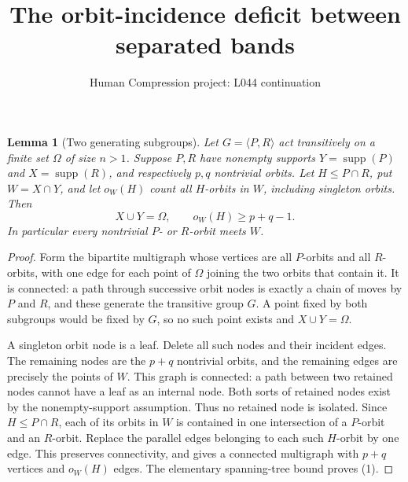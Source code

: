 \documentclass[11pt,a4paper]{article}
\title{The orbit-incidence deficit between separated bands}
\author{Human Compression project: L044 continuation}
\date{}
\newtheorem{lemma}{Lemma}
\newcommand{\gen}[1]{\langle#1\rangle}
\begin{document}
\maketitle
\begin{lemma}[Two generating subgroups]\label{incidence}
Let $G=\gen{P,R}$ act transitively on a finite set $\Omega$
of size $n>1$. Suppose $P,R$ have nonempty supports
$Y=\operatorname{supp}(P)$ and $X=\operatorname{supp}(R)$,
and respectively $p,q$ nontrivial orbits. Let $H\leq P\cap R$,
put $W=X\cap Y$, and let $o_W(H)$ count all $H$-orbits in
$W$, including singleton orbits. Then
\[
 X\cup Y=\Omega,\qquad o_W(H)\geq p+q-1.                 \tag{1}
\]
In particular every nontrivial $P$- or $R$-orbit meets $W$.
\end{lemma}
\begin{proof}
Form the bipartite multigraph whose vertices are all $P$-orbits
and all $R$-orbits, with one edge for each point of $\Omega$
joining the two orbits that contain it. It is connected:
a path through successive orbit nodes is exactly a chain of
moves by $P$ and $R$, and these generate the transitive group $G$.
A point fixed by both subgroups would be fixed by $G$, so no
such point exists and $X\cup Y=\Omega$.

A singleton orbit node is a leaf. Delete all such nodes and their
incident edges. The remaining nodes are the $p+q$ nontrivial
orbits, and the remaining edges are precisely the points of $W$.
This graph is connected: a path between two retained nodes cannot
have a leaf as an internal node. Both sorts of retained nodes
exist by the nonempty-support assumption. Thus no retained node
is isolated. Since $H\leq P\cap R$, each of its orbits in $W$
is contained in one intersection of a $P$-orbit and an $R$-orbit.
Replace the parallel edges belonging to each such $H$-orbit by
one edge. This preserves connectivity, and gives a connected
multigraph with $p+q$ vertices and $o_W(H)$ edges. The elementary
spanning-tree bound proves (1).
\end{proof}
\end{document}
